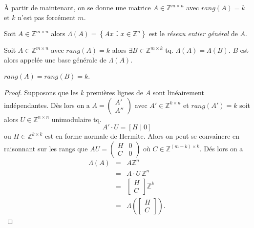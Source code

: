 À partir de maintenant, on se donne une matrice $A\in \mathbb{Z}^{m\times n}$ avec $rang(A)=k$ et $k$ n'est pas forcément $m$.

\begin{definition} \label{def:63}
  Soit  $A\in \mathbb{Z}^{m\times n}$ alors $\Lambda(A)=\left\{ Ax ：x\in \mathbb{Z
    }^{n} \right\} $ est le \emph{réseau entier général} de $A$.
\end{definition}



\begin{theorem}
    \label{thr:28d}
    Soit  $A\in \mathbb{Z}^{m\times n}$ avec $rang(A)=k$ alors $\exists B \in \mathbb{Z}^{m \times k}$ tq. $\Lambda(A)=\Lambda(B)$. $B$ est alors appelée une base générale de $\Lambda(A)$.
    \end{theorem}
    
    \begin{remark}
      $rang(A)=rang(B)=k$.
    \end{remark}
    
    \begin{proof}
      Supposons que les $k$ premières lignes de $A$ sont linéairement
      indépendantes.  Dès lors on a
      $A=\begin{pmatrix} A' \\ A'' \end{pmatrix}$ avec
      $A'\in \mathbb{Z}^{k \times n}$ et $rang(A')=k$ soit alors
      $U\in \mathbb{Z}^{n \times n}$ unimodulaire tq.
      \begin{displaymath}
        A' ⋅ U = [H \mid 0]
      \end{displaymath}
      ou
      $H \in \mathbb{Z}^{k \times k}$ est en forme normale de
      Hermite. Alors on peut se convaincre en raisonnant sur les rangs
      que $AU=\begin{pmatrix} H & 0 \\ C & 0 \end{pmatrix}$ où $C ∈ ℤ^{(m-k)×k}$. Dés lors
      on a
      \begin{eqnarray*}
        \Lambda(A) & = & A\mathbb{Z}^n \\
                   & = & A⋅U \, \mathbb{Z}^n \\
        & = & \left[\begin{matrix} H   \\
          C \end{matrix} \right]\mathbb{Z}^k \\
        & = & \Lambda\left(  \left[\begin{matrix} H   \\
          C \end{matrix} \right]  \right).
      \end{eqnarray*}      
    \end{proof}
    

